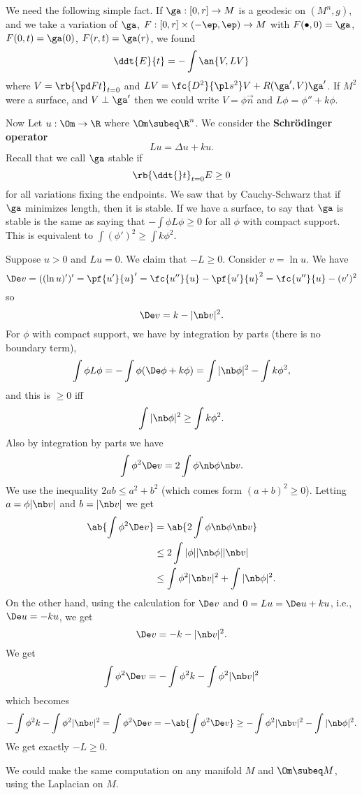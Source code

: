 We need the following simple fact. If $\ga:[0,r]\to M$ is a geodesic on $(M^n,g)$, and we take a variation of $\ga$, $F:[0,r]\times (-\ep,\ep)\to M$ with $F(\bullet, 0)=\ga$, $F(0,t)=\ga(0)$, $F(r,t)=\ga(r)$, we found
\[
\ddt{E}{t}=-\int \an{V,LV}
\]
where $V=\rb{\pd Ft}_{t=0}$ and $LV=\fc{D^2}{\pl s^2}V +R(\ga',V)\ga'$.
If $M^2$ were a surface, and $V\perp \ga'$ then we could write $V=\phi\vec n$ and $L\phi=\phi''+k\phi$.

Now Let $u:\Om\to \R$ where $\Om\subeq \R^n$. We consider the \textbf{Schr\"odinger operator}
\[
Lu=\Delta u+ku.
\]
Recall that we call $\ga$ stable if
\[
\rb{\ddt{}t}_{t=0}E\ge 0
\]
for all variations fixing the endpoints. We saw that by Cauchy-Schwarz that if $\ga$ minimizes length, then it is stable. If we have a surface, to say that $\ga$ is stable is the same as saying that $-\int \phi L\phi\ge 0$ for all $\phi$ with compact support. This is equivalent to $\int (\phi')^2\ge \int k\phi^2$.

Suppose $u>0$ %
and $Lu=0$. We claim that $-L\ge 0$.
Consider $v=\ln u$. We have
\[
\De v=((\ln u)')'=\pf{u'}{u}'=\fc{u''}{u}-\pf{u'}{u}^2 = \fc{u''}{u}-(v')^2
\]
so
\[
\De v=%
k-|\nb v|^2.
\]
For $\phi$ with compact support, we have by integration by parts (there is no boundary term),
\[
\int \phi L\phi = -\int \phi(\De \phi+k\phi)
=\int|\nb\phi|^2-\int k\phi^2,
\]
and this is $\ge0$ iff
\[
\int|\nb\phi|^2\ge \int k\phi^2.
\]
Also by integration by parts we have
\[
\int \phi^2\De v=2\int \phi\nb \phi\nb v.
\]
We use the inequality $2ab\le a^2+b^2$ (which comes form $(a+b)^2\ge 0$). Letting $a=\phi|\nb v|$ and $b=|\nb v|$ we get
\begin{align*}
\ab{\int \phi^2\De v}
&=\ab{2\int \phi\nb \phi\nb v}\\
&\le 2\int |\phi||\nb \phi||\nb v|\\
&\le \int \phi^2 |\nb v|^2 +\int |\nb \phi|^2.
\end{align*}
On the other hand, using the calculation for $\De v$ and $0=Lu=\De u +ku$, i.e., $\De u=-ku$, we get
\[
\De v=-k-|\nb v|^2.
\]
We get
\[
\int \phi^2\De v=-\int\phi^2k -\int \phi^2|\nb v|^2
\]
which becomes
\[
-\int \phi^2 k-\int \phi^2|\nb v|^2 =\int \phi^2\De v=-\ab{\int\phi^2\De v}\ge -\int \phi^2|\nb v|^2-\int |\nb \phi|^2.
\]
We get exactly $-L\ge 0$.

We could make the same computation on any manifold $M$ and $\Om\subeq M$, using the Laplacian on $M$.

